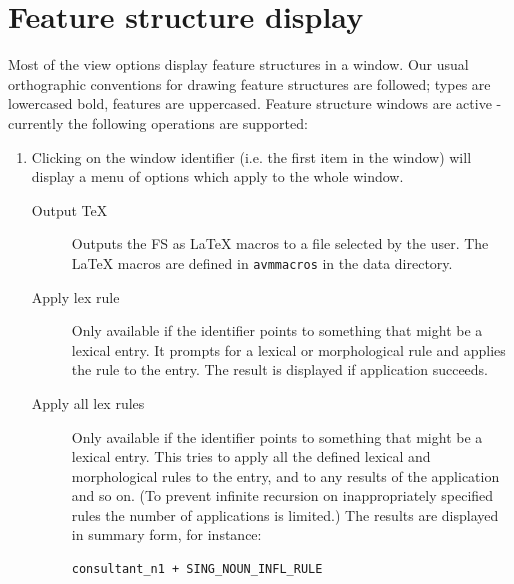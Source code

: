 \documentclass[12pt]{report}
\newcommand{\filename}[1]{{\tt #1}}
\begin{document}
\section{Feature structure display}
\label{activefs}

Most of the view options display feature structures in a window.  
Our usual orthographic conventions for
drawing feature structures are followed; types are lowercased bold,
features are uppercased.  Feature structure windows
are active - currently the following operations are supported:
\begin{enumerate}
\item Clicking on the window identifier (i.e. the first item in the
window) will display a menu of options which apply to the whole
window.
\begin{description}
\item [Output TeX] Outputs the FS as LaTeX macros to a file selected by
the user.  The LaTeX macros are defined in \filename{avmmacros}
in the data directory.
\item[Apply lex rule]
Only available if the identifier points to something that might
be a lexical entry.
It prompts for a lexical or morphological rule
and applies the rule to the entry.  The result is displayed if
application succeeds.  
\item[Apply all lex rules]
Only available if the identifier points to something that might
be a lexical entry.
This tries to apply all the defined
lexical and morphological rules to the entry, and to any results of
the application and so on.  (To prevent infinite recursion on
inappropriately specified rules the number of applications is limited.)
The results are displayed in summary form,
for instance:
\begin{verbatim}
consultant_n1 + SING_NOUN_INFL_RULE


\end{verbatim}
\end{description}
\end{enumerate}
\end{document}

